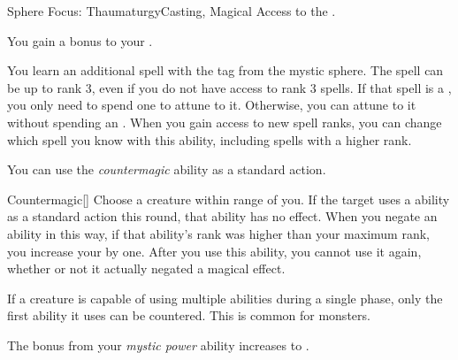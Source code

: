     \begin{magicalfeat}{Sphere Focus: Thaumaturgy}{Casting, Magical}
        \featpre Access to the  .

         You gain a  bonus to your .

         You learn an additional spell with the  tag from the  mystic sphere.
        The spell can be up to rank 3, even if you do not have access to rank 3 spells.
        If that spell is a , you only need to spend one  to attune to it.
        Otherwise, you can attune to it without spending an .
        When you gain access to new spell ranks, you can change which spell you know with this ability, including spells with a higher rank.

         You can use the \textit{countermagic} ability as a standard action.
        \begin{magicalactiveability}{Countermagic}[]
            \rankline
            Choose a creature within \rngmed range of you.
            If the target uses a \magical ability as a standard action this round, that ability has no effect.
            When you negate an ability in this way, if that ability's rank was higher than your maximum rank, you increase your  by one.
            After you use this ability, you  cannot use it again, whether or not it actually negated a magical effect.

            If a creature is capable of using multiple abilities during a single phase, only the first ability it uses can be countered.
            This is common for  monsters.
        \end{magicalactiveability}

         The bonus from your \textit{mystic power} ability increases to .
    \end{magicalfeat}

